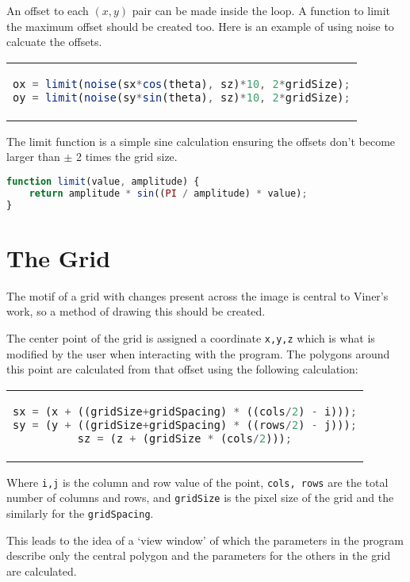 An offset to each $(x,y)$ pair can be made inside the loop. A function to limit
the maximum offset should be created too. Here is an example of using noise to
calcuate the offsets.

\begin{center}
\begin{tabular}{c}
\begin{lstlisting}[language=JavaScript]
ox = limit(noise(sx*cos(theta), sz)*10, 2*gridSize);
oy = limit(noise(sy*sin(theta), sz)*10, 2*gridSize);
\end{lstlisting}
\end{tabular}
\end{center}

The limit function is a simple sine calculation ensuring the offsets don't become
larger than $\pm$ 2 times the grid size.

\begin{lstlisting}[language=JavaScript]
function limit(value, amplitude) {
    return amplitude * sin((PI / amplitude) * value);
}
\end{lstlisting}

\section{The Grid}
The motif of a grid with changes present across the image is central to Viner's
work, so a method of drawing this should be created.

The center point of the grid is assigned a coordinate \verb|x,y,z| which is what
is modified by the user when interacting with the program. The polygons around
this point are calculated from that offset using the following calculation:

\begin{center}
\begin{tabular}{c}
\begin{lstlisting}[language=JavaScript]
sx = (x + ((gridSize+gridSpacing) * ((cols/2) - i)));
sy = (y + ((gridSize+gridSpacing) * ((rows/2) - j)));
sz = (z + (gridSize * (cols/2)));
\end{lstlisting}
\end{tabular}
\end{center}

Where \verb|i,j| is the column and row value of the point, \verb|cols, rows|
are the total number of columns and rows, and \verb|gridSize| is the pixel size
of the grid and the similarly for the \verb|gridSpacing|. 

This leads to the idea of a `view window' of which the parameters in the program
describe only the central polygon and the parameters for the others in the grid
are calculated.

